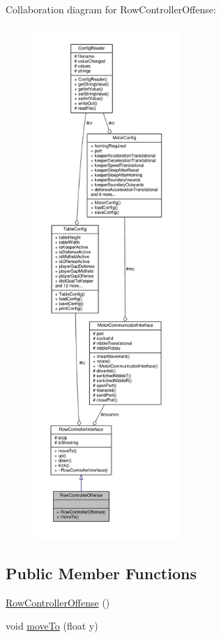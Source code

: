 Collaboration diagram for Row\+Controller\+Offense\+:\nopagebreak
\begin{figure}[H]
\begin{center}
\leavevmode
\includegraphics[height=550pt]{class_row_controller_offense__coll__graph}
\end{center}
\end{figure}
\subsection*{Public Member Functions}
\begin{DoxyCompactItemize}
\item 
\hyperlink{class_row_controller_offense_a79537184a3d7e1136c19d1f31c6f6308}{Row\+Controller\+Offense} ()
\item 
void \hyperlink{class_row_controller_offense_aad9b0e8ef1af0445f6e22fb111db907f}{move\+To} (float y)
\end{DoxyCompactItemize}

